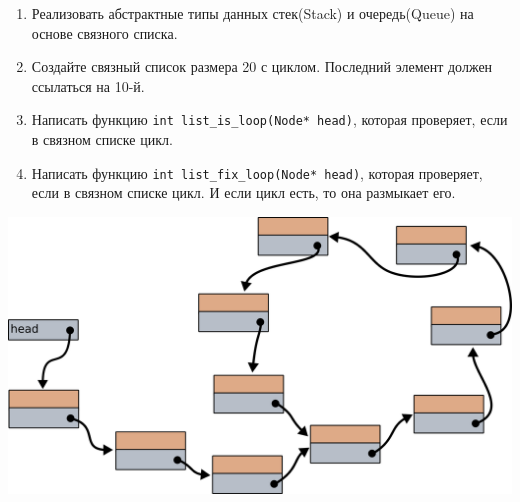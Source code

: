 \documentclass{article}
\begin{document}
\begin{enumerate}
\item Реализовать абстрактные типы данных стек(Stack) и очередь(Queue) на основе связного списка. 

\item Создайте связный список размера 20 с циклом. Последний элемент должен ссылаться на 10-й.

\item Написать функцию \texttt{int list\_is\_loop(Node* head)}, которая проверяет, если в связном списке цикл.

\item Написать функцию \texttt{int list\_fix\_loop(Node* head)}, которая проверяет, если в связном списке цикл. И если цикл есть, то она размыкает его.
\end{enumerate}
\begin{center}
\includegraphics[scale=0.77]{../images/list_loop.png}
\end{center}
\end{document}
